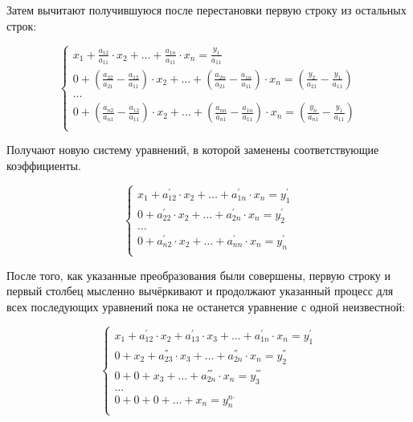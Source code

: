 \documentclass[bachelor, och, labwork]{shiza}
\begin{document}
    Затем вычитают получившуюся после перестановки первую строку из остальных строк:

    \begin{equation*}
      \begin{cases}
        x_1 +  \frac{a_{12}}{a_{11}} \cdot x_2  + \ldots + \frac{a_{1n}}{a_{11}} \cdot x_n = \frac{y_1}{a_{11}} \\
        0 +  (\frac{a_{22}}{a_{21}} - \frac{a_{12}}{a_{11}}) \cdot x_2 + \ldots + (\frac{a_{2n}}{a_{21}} - \frac{a_{1n}}{a_{11}}) \cdot x_n = (\frac{y_2}{a_{21}} - \frac{y_1}{a_{11}}) \\
        \ldots \\
        0 +  (\frac{a_{n2}}{a_{n1}} - \frac{a_{12}}{a_{11}}) \cdot x_2 + \ldots + (\frac{a_{nn}}{a_{n1}} - \frac{a_{1n}}{a_{11}}) \cdot x_n = (\frac{y_n}{a_{n1}} - \frac{y_1}{a_{11}}) \\
      \end{cases}
    \end{equation*}

    Получают новую систему уравнений, в которой заменены соответствующие коэффициенты.

    \begin{equation*}
      \begin{cases}
        x_1 +  a_{12}^{'} \cdot x_2 + \ldots + a_{1n}^{'} \cdot x_n = y_1^{'} \\
        0 +  a_{22}^{'} \cdot x_2 + \ldots + a_{2n}^{'} \cdot x_n = y_2^{'} \\
        \ldots \\
        0 +  a_{n2}^{'} \cdot x_2 + \ldots + a_{nn}^{'} \cdot x_n = y_n^{'} \\
      \end{cases}
    \end{equation*}

    После того, как указанные преобразования были совершены, первую строку и первый столбец мысленно
    вычёркивают и продолжают указанный процесс для всех последующих уравнений пока не останется уравнение с одной неизвестной:

    \begin{equation*}
      \begin{cases}
        x_1 + a_{12}^{'} \cdot x_2 + a_{13}^{'} \cdot x_3 + \ldots + a_{1n}^{'} \cdot x_n = y_1^{'} \\
        0 + x_2 + a_{23}^{''} \cdot x_3 + \ldots + a_{2n}^{''} \cdot x_n = y_2^{''} \\
        0 + 0 + x_3 + \ldots + a_{2n}^{'''} \cdot x_n = y_3^{'''} \\
        \ldots \\
        0 + 0 + 0 + \ldots + x_n = y_n^{n_{'}} \\
      \end{cases}
    \end{equation*}
  
\end{document}
